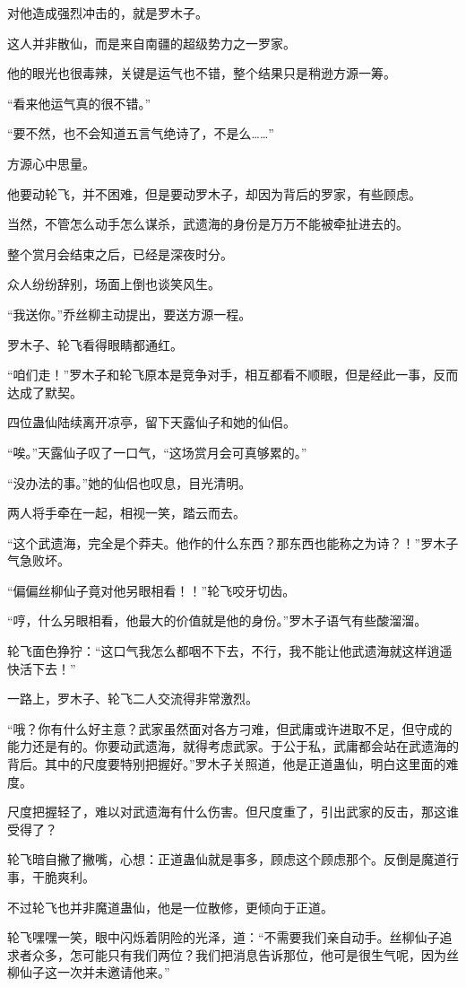 \begin{this_body}
对他造成强烈冲击的，就是罗木子。

这人并非散仙，而是来自南疆的超级势力之一罗家。

他的眼光也很毒辣，关键是运气也不错，整个结果只是稍逊方源一筹。

“看来他运气真的很不错。”

“要不然，也不会知道五言气绝诗了，不是么……”

方源心中思量。

他要动轮飞，并不困难，但是要动罗木子，却因为背后的罗家，有些顾虑。

当然，不管怎么动手怎么谋杀，武遗海的身份是万万不能被牵扯进去的。

整个赏月会结束之后，已经是深夜时分。

众人纷纷辞别，场面上倒也谈笑风生。

“我送你。”乔丝柳主动提出，要送方源一程。

罗木子、轮飞看得眼睛都通红。

“咱们走！”罗木子和轮飞原本是竞争对手，相互都看不顺眼，但是经此一事，反而达成了默契。

四位蛊仙陆续离开凉亭，留下天露仙子和她的仙侣。

“唉。”天露仙子叹了一口气，“这场赏月会可真够累的。”

“没办法的事。”她的仙侣也叹息，目光清明。

两人将手牵在一起，相视一笑，踏云而去。

“这个武遗海，完全是个莽夫。他作的什么东西？那东西也能称之为诗？！”罗木子气急败坏。

“偏偏丝柳仙子竟对他另眼相看！！”轮飞咬牙切齿。

“哼，什么另眼相看，他最大的价值就是他的身份。”罗木子语气有些酸溜溜。

轮飞面色狰狞：“这口气我怎么都咽不下去，不行，我不能让他武遗海就这样逍遥快活下去！”

一路上，罗木子、轮飞二人交流得非常激烈。

“哦？你有什么好主意？武家虽然面对各方刁难，但武庸或许进取不足，但守成的能力还是有的。你要动武遗海，就得考虑武家。于公于私，武庸都会站在武遗海的背后。其中的尺度要特别把握好。”罗木子关照道，他是正道蛊仙，明白这里面的难度。

尺度把握轻了，难以对武遗海有什么伤害。但尺度重了，引出武家的反击，那这谁受得了？

轮飞暗自撇了撇嘴，心想：正道蛊仙就是事多，顾虑这个顾虑那个。反倒是魔道行事，干脆爽利。

不过轮飞也并非魔道蛊仙，他是一位散修，更倾向于正道。

轮飞嘿嘿一笑，眼中闪烁着阴险的光泽，道：“不需要我们亲自动手。丝柳仙子追求者众多，怎可能只有我们两位？我们把消息告诉那位，他可是很生气呢，因为丝柳仙子这一次并未邀请他来。”


\end{this_body}
